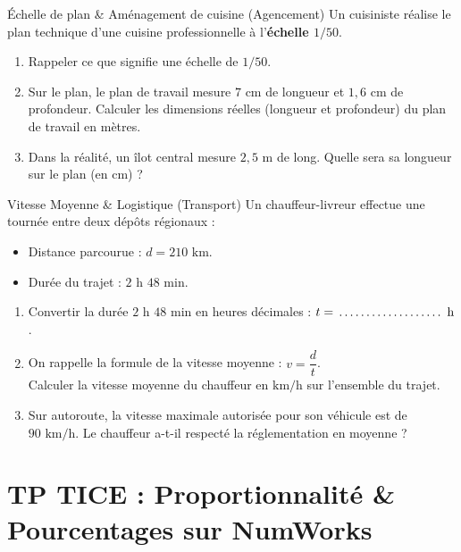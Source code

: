 \begin{exercice}[4 pts]{\capAnalyser}{Échelle de plan \& Aménagement de cuisine (Agencement)}
Un cuisiniste réalise le plan technique d'une cuisine professionnelle à l'\textbf{échelle $1/50$}.

\begin{enumerate}
    \item Rappeler ce que signifie une échelle de $1/50$.
    \item Sur le plan, le plan de travail mesure $7\text{ cm}$ de longueur et $1{,}6\text{ cm}$ de profondeur.
    Calculer les dimensions réelles (longueur et profondeur) du plan de travail en mètres.
    \item Dans la réalité, un îlot central mesure $2{,}5\text{ m}$ de long. Quelle sera sa longueur sur le plan (en cm) ?
\end{enumerate}
\lignesreponse[5]
\end{exercice}

\begin{exercice}[4 pts]{\capAnalyser}{Vitesse Moyenne \& Logistique (Transport)}
Un chauffeur-livreur effectue une tournée entre deux dépôts régionaux :
\begin{itemize}
    \item Distance parcourue : $d = 210\text{ km}$.
    \item Durée du trajet : $2\text{ h } 48\text{ min}$.
\end{itemize}

\begin{enumerate}
    \item Convertir la durée $2\text{ h } 48\text{ min}$ en heures décimales : $t = \pointille[3cm]\text{ h}$.
    \item On rappelle la formule de la vitesse moyenne : $v = \dfrac{d}{t}$.\\
    Calculer la vitesse moyenne du chauffeur en $\text{km/h}$ sur l'ensemble du trajet.
    \item Sur autoroute, la vitesse maximale autorisée pour son véhicule est de $90\text{ km/h}$. Le chauffeur a-t-il respecté la réglementation en moyenne ?
\end{enumerate}
\lignesreponse[4]
\end{exercice}

\section{TP TICE : Proportionnalité \& Pourcentages sur NumWorks}


